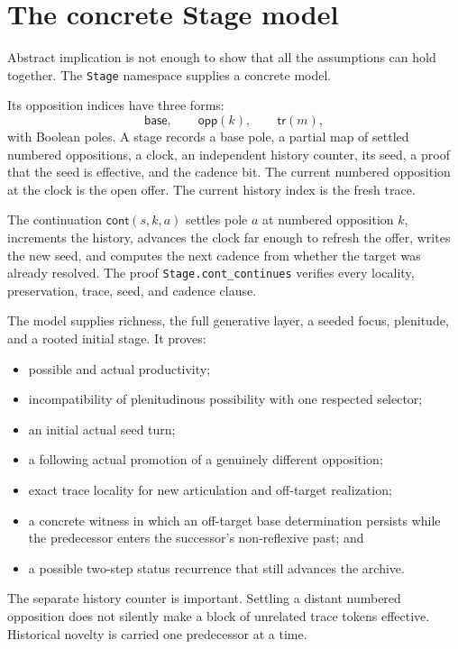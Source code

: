 \documentclass[11pt]{article}
\theoremstyle{definition}
\theoremstyle{remark}
\newcommand{\lean}[1]{\nolinkurl{#1}}
\begin{document}
\section{The concrete Stage model}

Abstract implication is not enough to show that all the assumptions can hold
together. The \lean{Stage} namespace supplies a concrete model.

Its opposition indices have three forms:
\[
  \mathsf{base},\qquad \mathsf{opp}(k),\qquad \mathsf{tr}(m),
\]
with Boolean poles. A stage records a base pole, a partial map of settled
numbered oppositions, a clock, an independent history counter, its seed, a
proof that the seed is effective, and the cadence bit. The current numbered
opposition at the clock is the open offer. The current history index is the
fresh trace.

The continuation \(\mathsf{cont}(s,k,a)\) settles pole \(a\) at numbered
opposition \(k\), increments the history, advances the clock far enough to
refresh the offer, writes the new seed, and computes the next cadence from
whether the target was already resolved. The proof
\lean{Stage.cont_continues} verifies every locality, preservation, trace,
seed, and cadence clause.

The model supplies richness, the full generative layer, a seeded focus,
plenitude, and a rooted initial stage. It proves:

\begin{itemize}
  \item possible and actual productivity;
  \item incompatibility of plenitudinous possibility with one respected
        selector;
  \item an initial actual seed turn;
  \item a following actual promotion of a genuinely different opposition;
  \item exact trace locality for new articulation and off-target realization;
  \item a concrete witness in which an off-target base determination persists
        while the predecessor enters the successor's non-reflexive past; and
  \item a possible two-step status recurrence that still advances the archive.
\end{itemize}

The separate history counter is important. Settling a distant numbered
opposition does not silently make a block of unrelated trace tokens effective.
Historical novelty is carried one predecessor at a time.
\end{document}
